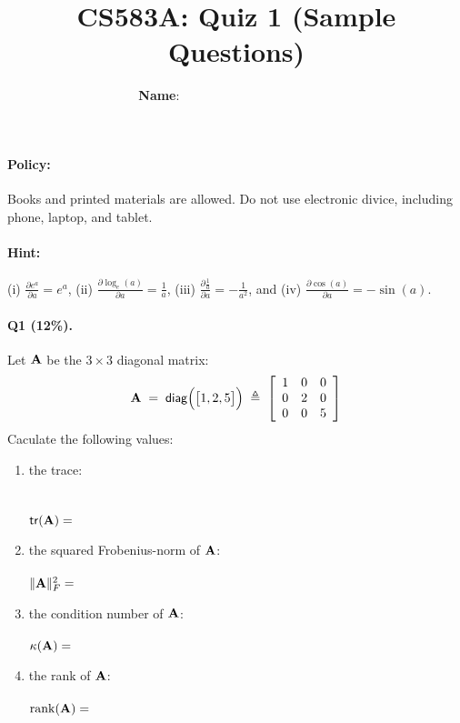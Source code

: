 \documentclass[11pt]{article}
\numberwithin{equation}{section}
\def\A{{\bf A}}
\def\tr{\mathsf{tr}}
\def\rk{\mathrm{rank}}
\def\diag{\mathsf{diag}}
\begin{document}


\title{CS583A: Quiz 1 (Sample Questions)}

\author{{\bf Name}: ~~~~~~~~~\qquad ~~~~~ \qquad~~~~~~~~~}

\date{ }

\maketitle



\paragraph{Policy:}
Books and printed materials are allowed. Do not use electronic divice, including phone, laptop, and tablet.

\paragraph{Hint:} (i) $\frac{\partial  e^a}{\partial a} = e^a$, (ii) $\frac{ \partial \log_e (a) }{\partial a  } = \frac{1}{a}$, (iii) $\frac{ \partial \frac{1}{a} }{\partial a  } = - \frac{1}{a^2}$, and (iv) $\frac{ \partial \cos (a) }{\partial a  } = - \sin (a)$.


\paragraph{Q1 (12\%).} 
	Let $\A$ be the $3 \times 3$ diagonal matrix:
	\begin{equation*}
	\A \; = \;
	\diag\Big( \big[ 1, 2, 5 \big] \Big)
	\; \triangleq \;
	\left[
	\begin{array}{ccc}
	1 & 0 & 0 \\
	0 & 2 & 0 \\
	0 & 0 & 5 \\
	\end{array}
	\right]
	\end{equation*}
Caculate the following values:
\begin{enumerate}
	\item 
	the trace:\\ ~\\~\\
	$\tr (\A ) = $
	\vspace{10mm}
	\item 
	the squared Frobenius-norm of $\A$: \\~\\
	$\|\A\|_F^2 = $
	\vspace{10mm}
	\item 
	the condition number of $\A$:\\~\\
	$\kappa (\A ) = $
	\vspace{10mm}
	\item 
	the rank of $\A$:\\~\\
	$\rk (\A ) = $
	\vspace{10mm}
\end{enumerate}
\end{document}
